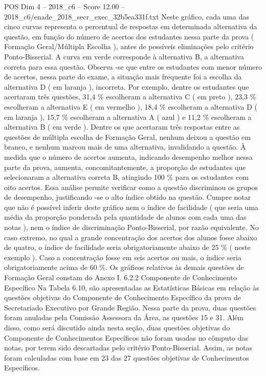 \begin{textsample}{POS Dim 4 – 2018\_c6 – Score 12.00 – 2018\_c6/enade\_2018\_secr\_exec\_32b5ea331f.txt}
Neste gráfico, cada uma das cinco curvas representa o percentual de respostas em determinada alternativa da questão, em função do número de acertos dos estudantes nessa parte da prova ( Formação Geral/Múltipla Escolha ), antes de possíveis eliminações pelo critério Ponto-Bisserial.
A curva em verde corresponde à alternativa B, a alternativa correta para essa questão.
Observa -se que entre os estudantes com menor número de acertos, nessa parte do exame, a situação mais frequente foi a escolha da alternativa D ( em laranja ), incorreta.
Por exemplo, dentre os estudantes que acertaram três questões, 31,4 \% escolheram a alternativa C ( em preto ), 23,3 \% escolheram a alternativa E ( em vermelho ), 18,4 \% escolheram a alternativa D ( em laranja ), 15,7 \% escolheram a alternativa A ( azul ) e 11,2 \% escolheram a alternativa B ( em verde ).
Dentre os que acertaram três respostas entre as questões de múltipla escolha de Formação Geral, nenhum deixou a questão em branco, e nenhum marcou mais de uma alternativa, invalidando a questão.
À medida que o número de acertos aumenta, indicando desempenho melhor nessa parte da prova, aumenta, concomitantemente, a proporção de estudantes que selecionaram a alternativa correta B, atingindo 100 \% para os estudantes com oito acertos.
Essa análise permite verificar como a questão discriminou os grupos de desempenho, justificando -se o alto índice obtido na questão.
Cumpre notar que não é possível inferir deste gráfico nem o índice de facilidade ( que seria uma média da proporção ponderada pela quantidade de alunos com cada uma das notas ), nem o índice de discriminação Ponto-Bisserial, por razão equivalente.
No caso extremo, no qual a grande concentração dos acertos dos alunos fosse abaixo de quatro, o índice de facilidade seria obrigatoriamente abaixo de 25 \% ( neste exemplo ).
Caso a concentração fosse em seis acertos ou mais, o índice seria obrigatoriamente acima de 60 \%.
Os gráficos relativos às demais questões de Formação Geral constam do Anexo I. 6.2.2 Componente de Conhecimento Específico Na Tabela 6.10, são apresentadas as Estatísticas Básicas em relação às questões objetivas do Componente de Conhecimento Específico da prova de Secretariado Executivo por Grande Região.
Nessa parte da prova, duas questões foram anuladas pela Comissão Assessora da Área, as questões 15 e 31.
Além disso, como será discutido ainda nesta seção, duas questões objetivas do Componente de Conhecimentos Específicos não foram usadas no cômputo das notas, por terem sido descartadas pelo critério Ponto-Bisserial.
Assim, as notas foram calculadas com base em 23 das 27 questões objetivas de Conhecimentos Específicos.

\end{textsample}
